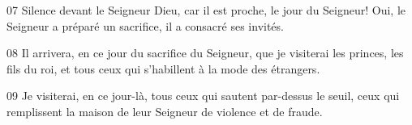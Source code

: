 
07 Silence devant le Seigneur Dieu, car il est proche, le jour du Seigneur! Oui, le Seigneur a préparé un sacrifice, il a consacré ses invités.

08 Il arrivera, en ce jour du sacrifice du Seigneur, que je visiterai les princes, les fils du roi, et tous ceux qui s’habillent à la mode des étrangers.

09 Je visiterai, en ce jour-là, tous ceux qui sautent par-dessus le seuil, ceux qui remplissent la maison de leur Seigneur de violence et de fraude.